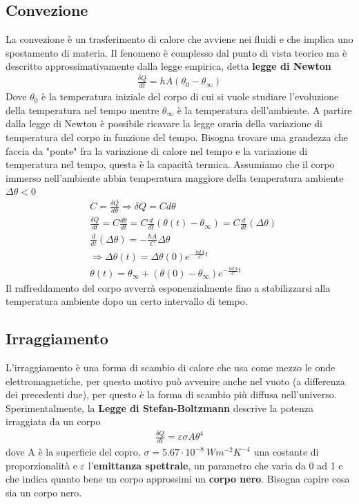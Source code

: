\documentclass[10pt,a4paper]{article}
\begin{document}
\subsection{Convezione}
La convezione è un trasferimento di calore che avviene nei fluidi e che implica uno spostamento di materia. Il fenomeno è complesso dal punto di vista teorico ma è descritto approssimativamente dalla legge empirica, detta \textbf{legge di Newton}
\begin{align*}
	\frac{\delta Q}{dt} = h A (\theta_0-\theta_{\infty})
\end{align*}
Dove $\theta_0$ è la temperatura iniziale del corpo di cui si vuole studiare l'evoluzione della temperatura nel tempo mentre $\theta_{\infty}$ è la temperatura dell'ambiente. A partire dalla legge di Newton è possibile ricavare la legge oraria della variazione di temperatura del corpo in funzione del tempo. Bisogna trovare una grandezza che faccia da "ponte" fra la variazione di calore nel tempo e la variazione di temperatura nel tempo, questa è la capacità termica. Assumiamo che il corpo immerso nell'ambiente abbia temperatura maggiore della temperatura ambiente \(\Delta\theta < 0\)
\begin{align*}
	&C = \frac{\delta Q}{d\theta} \Rightarrow \delta Q = C d\theta\\
	&\frac{\delta Q }{dt} =C \frac{d\theta}{dt}=C \frac{d}{dt}(\theta(t)-\theta_{\infty}) = C \frac{d}{dt} (\Delta\theta)\\
	&\frac{d}{dt} (\Delta\theta) = -\frac{h A}{C}\Delta\theta\\
	&\Rightarrow\Delta\theta(t) =  \Delta\theta(0) e^{-\frac{h dA }{C}t}\\
	&\theta(t) = \theta_{\infty} + (\theta(0)-\theta_{\infty}) e^{-\frac{h dA }{C}t}
\end{align*} 
Il raffreddamento del corpo avverrà esponenzialmente fino a stabilizzarsi alla temperatura ambiente dopo un certo intervallo di tempo. 
\subsection{Irraggiamento}
L'irraggiamento è una forma di scambio di calore che usa come mezzo le onde elettromagnetiche, per questo motivo può avvenire anche nel vuoto (a differenza dei precedenti due), per questo è la forma di scambio più diffusa nell'universo. Sperimentalmente, la \textbf{Legge di Stefan-Boltzmann} descrive la potenza irraggiata da un corpo
\begin{align*}
	\frac{\delta Q }{dt} = \varepsilon \sigma A \theta^4
\end{align*}
dove A è la superficie del copro, \(\sigma = 5.67 \cdot 10^{-8}\ W m^{-2}K^{-4}\) una costante di proporzionalità e $\varepsilon$ l'\textbf{emittanza spettrale}, un parametro che varia da 0 ad 1 e che indica quanto bene un corpo approssimi un \textbf{corpo nero}. Bisogna capire cosa sia un corpo nero. 
\end{document}
